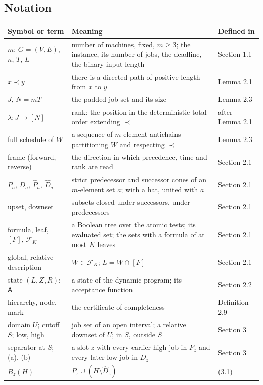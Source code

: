 \documentclass[11pt,a4paper]{article}
\theoremstyle{plain}
\theoremstyle{definition}
\begin{document}
\subsection*{Notation}

\noindent
{\footnotesize
\begin{longtable}{@{}L{4.0cm}L{8.2cm}L{2.5cm}@{}}
\toprule
Symbol or term & Meaning & Defined in \\
\midrule
\endhead
\bottomrule
\endfoot
$m$; $G=(V,E)$, $n$, $T$, $L$ & number of machines, fixed, $m\geq3$; the instance, its number of jobs, the deadline, the binary input length & Section 1.1 \\
$x\prec y$ & there is a directed path of positive length from $x$ to $y$ & Lemma 2.1 \\
$J$, $N=mT$ & the padded job set and its size & Lemma 2.3 \\
$\lambda\colon J\to[N]$ & rank: the position in the deterministic total order extending $\prec$ & after Lemma 2.1 \\
full schedule of $W$ & a sequence of $m$-element antichains partitioning $W$ and respecting $\prec$ & Lemma 2.3 \\
frame (forward, reverse) & the direction in which precedence, time and rank are read & Section 2.1 \\
$P_a$, $D_a$, $\widehat P_a$, $\widehat D_a$ & strict predecessor and successor cones of an $m$-element set $a$; with a hat, united with $a$ & Section 2.1 \\
upset, downset & subsets closed under successors, under predecessors & Section 2.1 \\
formula, leaf, $[F]$, $\mathcal F_K$ & a Boolean tree over the atomic tests; its evaluated set; the sets with a formula of at most $K$ leaves & Section 2.1 \\
global, relative description & $W\in\mathcal F_K$; $L=W\cap[F]$ & Section 2.1 \\
state $(L,Z,R)$; $\mathsf A$ & a state of the dynamic program; its acceptance function & Section 2.2 \\
hierarchy, node, mark & the certificate of completeness & Definition 2.9 \\
domain $U$; cutoff $S$; low, high & job set of an open interval; a relative downset of $U$; in $S$, outside $S$ & Section 3 \\
separator at $S$; (a), (b) & a slot $z$ with every earlier high job in $P_z$ and every later low job in $D_z$ & Section 3 \\
$B_z(H)$ & $P_z\cup(H\setminus\widehat D_z)$ & (3.1) \\

\end{longtable}}
\end{document}
